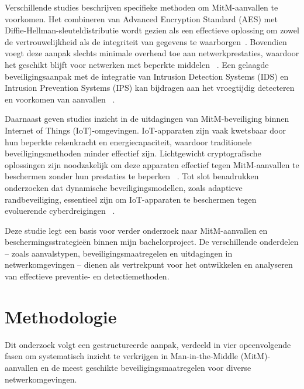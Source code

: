 Verschillende studies beschrijven specifieke methoden om MitM-aanvallen te voorkomen. Het combineren van Advanced Encryption Standard (AES) met Diffie-Hellman-sleuteldistributie wordt gezien als een effectieve oplossing om zowel de vertrouwelijkheid als de integriteit van gegevens te waarborgen~\autocite{ELRAWY2023}. Bovendien voegt deze aanpak slechts minimale overhead toe aan netwerkprestaties, waardoor het geschikt blijft voor netwerken met beperkte middelen ~\autocite{HALGAMUGE2025}. Een gelaagde beveiligingsaanpak met de integratie van Intrusion Detection Systems (IDS) en Intrusion Prevention Systems (IPS) kan bijdragen aan het vroegtijdig detecteren en voorkomen van aanvallen   ~\autocite{ANKARI2022}.

Daarnaast geven studies inzicht in de uitdagingen van MitM-beveiliging binnen Internet of Things (IoT)-omgevingen. IoT-apparaten zijn vaak kwetsbaar door hun beperkte rekenkracht en energiecapaciteit, waardoor traditionele beveiligingsmethoden minder effectief zijn. Lichtgewicht cryptografische oplossingen zijn noodzakelijk om deze apparaten effectief tegen MitM-aanvallen te beschermen zonder hun prestaties te beperken ~\autocite{ANKARI2022}. Tot slot benadrukken onderzoeken dat dynamische beveiligingsmodellen, zoals adaptieve randbeveiliging, essentieel zijn om IoT-apparaten te beschermen tegen evoluerende cyberdreigingen ~\autocite{HALGAMUGE2025}.

Deze studie legt een basis voor verder onderzoek naar MitM-aanvallen en beschermingsstrategieën binnen mijn bachelorproject. De verschillende onderdelen – zoals aanvalstypen, beveiligingsmaatregelen en uitdagingen in  netwerkomgevingen – dienen als vertrekpunt voor het ontwikkelen en analyseren van effectieve preventie- en detectiemethoden.



\section{Methodologie}%
\label{sec:methodologie}
Dit onderzoek volgt een gestructureerde aanpak, verdeeld in vier opeenvolgende fasen om systematisch inzicht te verkrijgen in Man-in-the-Middle (MitM)-aanvallen en de meest geschikte beveiligingsmaatregelen voor diverse netwerkomgevingen.

